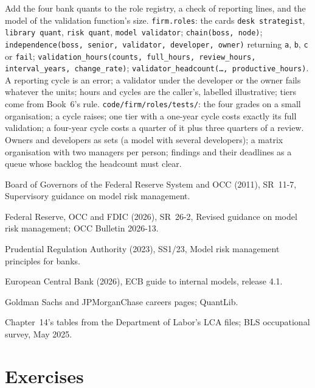 \begin{build}
 Add the four bank quants to the role registry, a check of reporting lines, and the model of the
validation function's size.
 \texttt{firm.roles}: the cards \texttt{desk strategist}, \texttt{library quant}, \texttt{risk quant},
\texttt{model validator}; \texttt{chain(boss, node)}; \texttt{independence(boss, senior, validator, developer, owner)}
returning \texttt{a}, \texttt{b}, \texttt{c} or \texttt{fail}; \texttt{validation\_hours(counts, full\_hours,
review\_hours, interval\_years, change\_rate)}; \texttt{validator\_headcount(\dots, productive\_hours)}.
 A reporting cycle is an error; a validator under the developer or the owner fails whatever the units; hours
and cycles are the caller's, labelled illustrative; tiers come from Book~6's rule.
 \texttt{code/firm/roles/tests/}: the four grades on a small organisation; a cycle raises; one
tier with a one-year cycle costs exactly its full validation; a four-year cycle costs a quarter of it plus three quarters
of a review.
 Owners and developers as sets (a model with several developers); a matrix organisation with two managers
per person; findings and their deadlines as a queue whose backlog the headcount must clear.
\end{build}

\begin{omsources}
\item Board of Governors of the Federal Reserve System and OCC (2011), SR~11-7, Supervisory guidance on model risk
management.
\item Federal Reserve, OCC and FDIC (2026), SR~26-2, Revised guidance on model risk management; OCC Bulletin 2026-13.
\item Prudential Regulation Authority (2023), SS1/23, Model risk management principles for banks.
\item European Central Bank (2026), ECB guide to internal models, release 4.1.
\item Goldman Sachs and JPMorganChase careers pages; QuantLib.
\item Chapter~14's tables from the Department of Labor's LCA files; BLS occupational survey, May 2025.
\end{omsources}

\section{Exercises}

